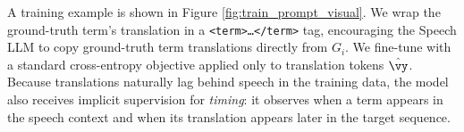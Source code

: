 A training example is shown in Figure \ref{fig:train_prompt_visual}. We wrap the ground-truth term's translation in a \texttt{\textless term\textgreater\ldots\textless/term\textgreater} tag, encouraging the Speech LLM to copy ground-truth term translations directly from $G_i$. We fine-tune with a standard cross-entropy objective applied only to translation tokens $\hat{\vy}$. Because translations naturally lag behind speech in the training data, the model also receives implicit supervision for \emph{timing}: it observes when a term appears in the speech context and when its translation appears later in the target sequence.

